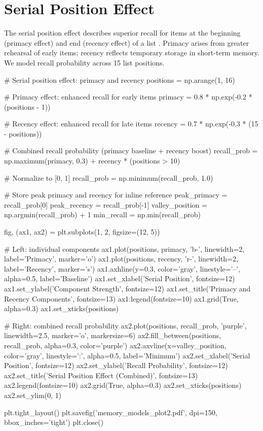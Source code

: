 \documentclass[11pt,a4paper]{article}
\begin{document}
\section{Serial Position Effect}

The serial position effect describes superior recall for items at the beginning (primacy effect) and end (recency effect) of a list \cite{murdock1962}. Primacy arises from greater rehearsal of early items; recency reflects temporary storage in short-term memory. We model recall probability across 15 list positions.

\begin{pycode}
# Serial position effect: primacy and recency
positions = np.arange(1, 16)

# Primacy effect: enhanced recall for early items
primacy = 0.8 * np.exp(-0.2 * (positions - 1))

# Recency effect: enhanced recall for late items
recency = 0.7 * np.exp(-0.3 * (15 - positions))

# Combined recall probability (primacy baseline + recency boost)
recall_prob = np.maximum(primacy, 0.3) + recency * (positions > 10)

# Normalize to [0, 1]
recall_prob = np.minimum(recall_prob, 1.0)

# Store peak primacy and recency for inline reference
peak_primacy = recall_prob[0]
peak_recency = recall_prob[-1]
valley_position = np.argmin(recall_prob) + 1
min_recall = np.min(recall_prob)

fig, (ax1, ax2) = plt.subplots(1, 2, figsize=(12, 5))

# Left: individual components
ax1.plot(positions, primacy, 'b-', linewidth=2, label='Primacy', marker='o')
ax1.plot(positions, recency, 'r-', linewidth=2, label='Recency', marker='s')
ax1.axhline(y=0.3, color='gray', linestyle='--', alpha=0.5, label='Baseline')
ax1.set_xlabel('Serial Position', fontsize=12)
ax1.set_ylabel('Component Strength', fontsize=12)
ax1.set_title('Primacy and Recency Components', fontsize=13)
ax1.legend(fontsize=10)
ax1.grid(True, alpha=0.3)
ax1.set_xticks(positions)

# Right: combined recall probability
ax2.plot(positions, recall_prob, 'purple', linewidth=2.5, marker='o', markersize=6)
ax2.fill_between(positions, recall_prob, alpha=0.3, color='purple')
ax2.axvline(x=valley_position, color='gray', linestyle=':', alpha=0.5, label='Minimum')
ax2.set_xlabel('Serial Position', fontsize=12)
ax2.set_ylabel('Recall Probability', fontsize=12)
ax2.set_title('Serial Position Effect (Combined)', fontsize=13)
ax2.legend(fontsize=10)
ax2.grid(True, alpha=0.3)
ax2.set_xticks(positions)
ax2.set_ylim(0, 1)

plt.tight_layout()
plt.savefig('memory_models_plot2.pdf', dpi=150, bbox_inches='tight')
plt.close()
\end{pycode}
\end{document}
